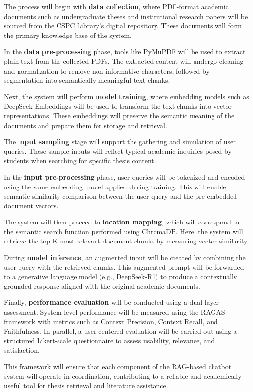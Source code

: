 \begin{refsection}
The process will begin with \textbf{data collection}, where PDF-format academic documents such as undergraduate theses and institutional research papers will be sourced from the CSPC Library’s digital repository. These documents will form the primary knowledge base of the system.

In the \textbf{data pre-processing} phase, tools like PyMuPDF will be used to extract plain text from the collected PDFs. The extracted content will undergo cleaning and normalization to remove non-informative characters, followed by segmentation into semantically meaningful text chunks.

Next, the system will perform \textbf{model training}, where embedding models such as DeepSeek Embeddings will be used to transform the text chunks into vector representations. These embeddings will preserve the semantic meaning of the documents and prepare them for storage and retrieval.

The \textbf{input sampling} stage will support the gathering and simulation of user queries. These sample inputs will reflect typical academic inquiries posed by students when searching for specific thesis content.

In the \textbf{input pre-processing} phase, user queries will be tokenized and encoded using the same embedding model applied during training. This will enable semantic similarity comparison between the user query and the pre-embedded document vectors.

The system will then proceed to \textbf{location mapping}, which will correspond to the semantic search function performed using ChromaDB. Here, the system will retrieve the top-K most relevant document chunks by measuring vector similarity.

During \textbf{model inference}, an augmented input will be created by combining the user query with the retrieved chunks. This augmented prompt will be forwarded to a generative language model (e.g., DeepSeek-R1) to produce a contextually grounded response aligned with the original academic documents.

Finally, \textbf{performance evaluation} will be conducted using a dual-layer assessment. System-level performance will be measured using the RAGAS framework with metrics such as Context Precision, Context Recall, and Faithfulness. In parallel, a user-centered evaluation will be carried out using a structured Likert-scale questionnaire to assess usability, relevance, and satisfaction.

This framework will ensure that each component of the RAG-based chatbot system will operate in coordination, contributing to a reliable and academically useful tool for thesis retrieval and literature assistance.



\clearpage

\printbibliography[heading=subbibintoc, title={\centering Notes}]
\end{refsection}